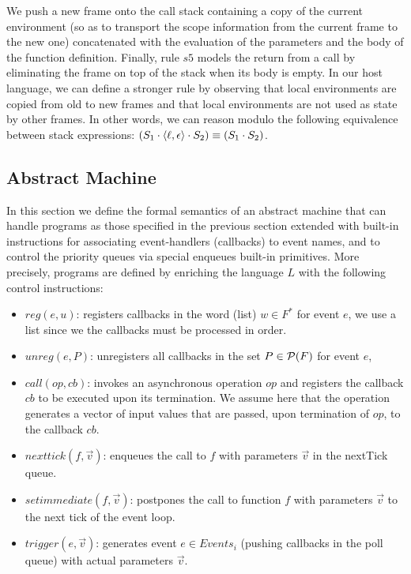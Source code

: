 We push a new frame onto the call stack containing a copy of the current environment
(so as to transport the scope information from the current frame to the new one) concatenated with the evaluation of the parameters and  
the body of the function definition.
Finally, rule $s5$ models the return from a call by eliminating the frame on top of the stack when its  body is empty.
In our host language, we can define a stronger rule by observing that  local environments are copied from old to new frames and that local environments are not used as state  by other frames. 
In other words, we can reason modulo the following equivalence between stack expressions:
$(S_1\cdot \langle \ell,\epsilon \rangle\cdot S_2)\equiv (S_1\cdot S_2)$.

\subsection{Abstract Machine}
%
In this section we define the formal semantics of an abstract machine that can handle 
programs as those specified in the previous section extended with built-in instructions for associating event-handlers (callbacks) to event names, and to control the priority queues 
via special enqueues built-in primitives.
More precisely, programs are defined by enriching the language $L$ with the following control instructions:
\begin{itemize}
\item
$reg(e,u)$: registers callbacks in the word (list) $w\in F^*$  for event $e$, we use a list 
since we the callbacks must be processed in order.
\item 
$unreg(e,P)$: unregisters all callbacks in the set $P\in {\cal P}(F)$ for event $e$, 
\item 
$call(op,cb)$: invokes an asynchronous operation $op$ and registers the callback $cb$ to be executed upon its termination.
We assume here that the operation generates a vector of input values that are passed, upon termination of $op$,  to the callback $cb$.
\item 
$nexttick(f,\vec{v})$: enqueues the call to $f$ with parameters $\vec{v}$ in the nextTick queue.
\item
$setimmediate(f,\vec{v})$: postpones the call to function $f$ with parameters $\vec{v}$ to the next tick of the event loop.
\item 
$trigger(e,\vec{v})$: generates event $e\in Events_i$ (pushing callbacks in the poll queue) with actual parameters $\vec{v}$.
\end{itemize} 
%

